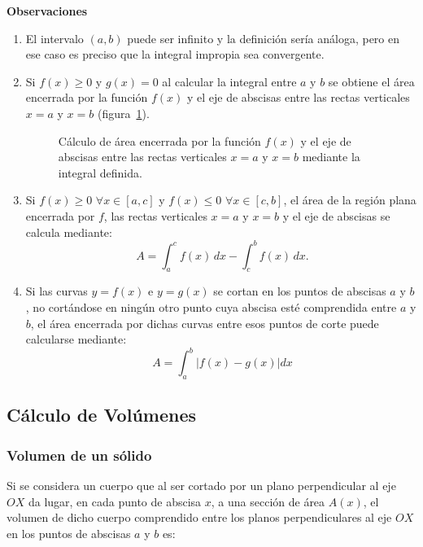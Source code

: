 \noindent \textbf{Observaciones}

\begin{enumerate}

\item El intervalo $(a,b)$ puede ser infinito y la definición sería análoga, pero en ese caso es preciso que la integral impropia sea convergente.

\item Si $f(x)\geq0$ y $g(x)=0$ al calcular la integral entre $a$ y $b$ se obtiene el área encerrada por la función $f(x)$ y el eje de abscisas entre las rectas verticales $x=a$ y $x=b$ (figura~\ref{g:integral_definida}).

\begin{figure}[h!]
\begin{center}
\scalebox{1}{}
\caption{Cálculo de área encerrada por la función $f(x)$ y el eje de
abscisas entre las rectas verticales $x=a$ y $x=b$  mediante la
integral definida.} \label{g:integral_definida}
\end{center}
\end{figure}

\item Si $f(x)\geq 0$ $\forall x\in[a,c]$ y $f(x)\leq 0$ $\forall x\in[c,b]$, el área de la región plana encerrada por $f$, las rectas verticales $x=a$ y $x=b$ y el eje de abscisas se calcula
mediante:
\[
\ A= \int_{a}^{c}{f(x)\,dx} - \int_{c}^{b}{f(x)\,dx}.
\]

\item Si las curvas $y=f(x)$ e $y=g(x)$ se cortan en los puntos de abscisas $a$ y $b$, no cortándose en ningún otro punto cuya abscisa esté comprendida entre $a$ y $b$, el área encerrada por dichas curvas entre esos puntos de corte puede calcularse
mediante:
\[
\ A= \int_{a}^{b}{|f(x)-g(x)|dx}
\]
\end{enumerate}


\subsection{Cálculo de Volúmenes}

\subsubsection*{Volumen de un sólido}
Si se considera un cuerpo que al ser cortado por un plano
perpendicular al eje $OX$ da lugar, en cada punto de abscisa $x$, a
una sección de área $A(x)$, el volumen de dicho cuerpo comprendido
entre los planos perpendiculares al eje $OX$ en los puntos de
abscisas $a$ y $b$ es:

